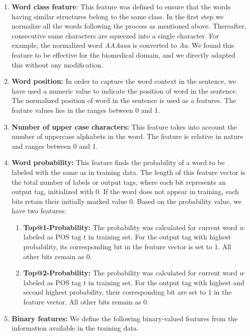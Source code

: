 \documentclass[11pt,a4paper]{article}
\begin{document}
\begin{enumerate}
\item \textbf{Word class feature}: This feature was defined to ensure that the words having similar structures belong to the same class. In the first step we normalize all the words following the process as mentioned above. Thereafter, consecutive same characters are squeezed into a single character. For example, the normalized word \textit{AAAaaa} is converted to \textit{Aa}. We found this feature to be effective for the biomedical domain, and we directly adapted this without any modification.
\item \textbf{Word position:} In order to capture the word context in the sentence, we have used a numeric value to indicate the position of word in the sentence. The normalized position of word in the sentence is used as a features. The feature values lies in the ranges between 0 and 1. 
\item \textbf{Number of upper case characters:} This feature takes into account the number of uppercase alphabets in the word. The feature is relative in nature and ranges between $0$ and $1$. 
\item \textbf{Word probability:} This feature finds the probability of a word to be labeled with the same as in training data. The length of this feature vector is the total number of labels or output tags, where each bit represents an output tag, initialized with $0$. If the word does not appear in training, each bits retain their initially marked value $0$. Based on the probability value, we have two features:
\begin{enumerate}
\item \textbf{Top@1-Probability:} The probability was calculated for current word $w$ labeled as POS tag $t$ in training set. For the output tag with highest probability, its corresponding bit in the feature vector is set to $1$. All other bits remain as $0$.
\item \textbf{Top@2-Probability:}  The probability was calculated for current word $w$ labeled as POS tag $t$ in training set. For the output tag with highest and second highest probability, their corresponding bit are set to $1$ in the feature vector. All other bits remain as $0$.
\end{enumerate}
\item \textbf{Binary features:} %
We define the following binary-valued features from the information available in the training data.
\begin{enumerate}

\end{enumerate}
\end{enumerate}
\end{document}
